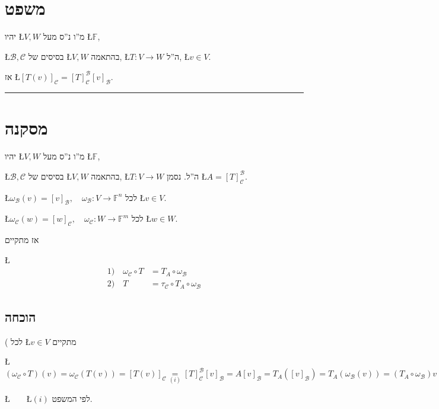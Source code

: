 \documentclass[english,hebrew]{article}
\begin{document}
\section{משפט}

יהיו \L{$V,W$} מ\textquotedblright ו נ\textquotedblright ס מעל \L{$\mathbb{F}$},

\L{$\mathcal{B},\mathcal{C}$} בסיסים של \L{$V,W$} בהתאמה, \L{$T:V\rightarrow W$}
ה\textquotedblright ל, \L{$v\in V$}.

אז \L{$[T(v)]_{\mathcal{C}}=[T]_{\mathcal{C}}^{\mathcal{B}}[v]_{\mathcal{B}}$}.

\rule[0.5ex]{1\columnwidth}{1pt}

\section{מסקנה}

יהיו \L{$V,W$} מ\textquotedblright ו נ\textquotedblright ס מעל \L{$\mathbb{F}$},

\L{$\mathcal{B},\mathcal{C}$} בסיסים של \L{$V,W$} בהתאמה, \L{$T:V\rightarrow W$}
ה\textquotedblright ל. נסמן \L{$A=[T]_{\mathcal{C}}^{\mathcal{B}}$}.

\L{$\omega_{\mathcal{B}}(v)=[v]_{\mathcal{B}},\quad\omega_{\mathcal{B}}:V\rightarrow\mathbb{F}^{n}$}
לכל \L{$v\in V$}.

\L{$\omega_{\mathcal{C}}(w)=[w]_{\mathcal{C}},\quad\omega_{\mathcal{C}}:W\rightarrow\mathbb{F}^{m}$}
לכל \L{$w\in W$}.

אז מתקיים

\L{%
\begin{align*}
1)\quad\omega_{\mathcal{C}}\circ T & =T_{A}\circ\omega_{\mathcal{B}}\\
2)\quad T & =\tau_{\mathcal{C}}\circ T_{A}\circ\omega_{\mathcal{B}}
\end{align*}
}%

\subsection{הוכחה}

{\endL}( לכל \L{$v\in V$} מתקיים

\L{$(\omega_{\mathcal{C}}\circ T)(v)=\omega_{\mathcal{C}}(T(v))=[T(v)]_{\mathcal{C}}\underset{(i)}{=}[T]_{\mathcal{C}}^{\mathcal{B}}[v]_{\mathcal{B}}=A[v]_{\mathcal{B}}=T_{A}([v]_{\mathcal{B}})=T_{A}(\omega_{\mathcal{B}}(v))=(T_{A}\circ\omega_{\mathcal{B}})v$}

\L{$\qquad$}\L{$(i)$} לפי המשפט.
\end{document}
